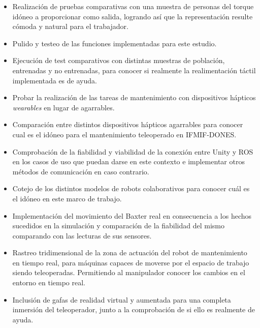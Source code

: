  \begin{itemize}
    \item Realización de pruebas comparativas con una muestra de personas del torque idóneo a proporcionar como salida, logrando así que la representación resulte cómoda y natural para el trabajador.
    
    \item Pulido y testeo de las funciones implementadas para este estudio.
     
    \item Ejecución de test comparativos con distintas muestras de población, entrenadas y no entrenadas, para conocer si realmente la realimentación táctil implementada es de ayuda.
     
    \item Probar la realización de las tareas de mantenimiento con dispositivos hápticos \textit{wearables} en lugar de agarrables.
     
    \item Comparación entre distintos dispositivos hápticos agarrables para conocer cual es el idóneo para el mantenimiento teleoperado en IFMIF-DONES.
     
    \item Comprobación de la fiabilidad y viabilidad de la conexión entre Unity y ROS en los casos de uso que puedan darse en este contexto e implementar otros métodos de comunicación en caso contrario.
     
    \item Cotejo de los distintos modelos de robots colaborativos para conocer cuál es el idóneo en este marco de trabajo.
     
    \item Implementación del movimiento del Baxter real en consecuencia a los hechos sucedidos en la simulación y comparación de la fiabilidad del mismo comparando con las lecturas de sus sensores.
     
    \item Rastreo tridimensional de la zona de actuación del robot de mantenimiento en tiempo real, para máquinas capaces de moverse por el espacio de trabajo siendo teleoperadas. Permitiendo al manipulador conocer los cambios en el entorno en tiempo real.
     
    \item Inclusión de gafas de realidad virtual y aumentada para una completa inmersión del teleoperador, junto a la comprobación de si ello es realmente de ayuda.
 \end{itemize}